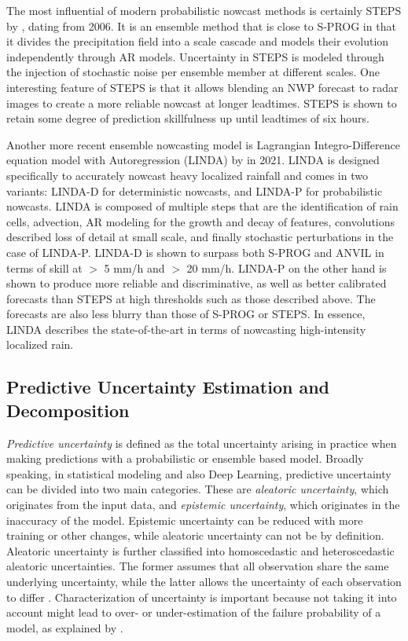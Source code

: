 The most influential of modern probabilistic nowcast methods is certainly STEPS by \citet{bowler_steps_2006}, dating from 2006. It is an ensemble method that is close to S-PROG in that it divides the precipitation field into a scale cascade and models their evolution independently through AR models. Uncertainty in STEPS is modeled through the injection of stochastic noise per ensemble member at different scales. One interesting feature of STEPS is that it allows blending an NWP forecast to radar images to create a more reliable nowcast at longer leadtimes. STEPS is shown to retain some degree of prediction skillfulness up until leadtimes of six hours. \citet{bowler_steps_2006}

Another more recent ensemble nowcasting model is Lagrangian Integro-Difference equation model with Autoregression (LINDA) by \citet{pulkkinen_lagrangian_2021} in 2021. LINDA is designed specifically to accurately nowcast heavy localized rainfall and comes in two variants: LINDA-D for deterministic nowcasts, and LINDA-P for probabilistic nowcasts. LINDA is composed of multiple steps that are the identification of rain cells, advection, AR modeling for the growth and decay of features, convolutions described loss of detail at small scale, and finally stochastic perturbations in the case of LINDA-P. LINDA-D is shown to surpass both S-PROG and ANVIL in terms of skill at  $>$ 5 mm/h and $>$ 20 mm/h. LINDA-P on the other hand is shown to produce more reliable and discriminative, as well as better calibrated forecasts than STEPS at high thresholds such as those described above. The forecasts are also less blurry than those of S-PROG or STEPS. In essence, LINDA describes the state-of-the-art in terms of nowcasting high-intensity localized rain. 


\subsection{Predictive Uncertainty Estimation and Decomposition}

\textit{Predictive uncertainty} is defined as the total uncertainty arising in practice when making predictions with a probabilistic or ensemble based model.
Broadly speaking, in statistical modeling and also Deep Learning, predictive uncertainty can be divided into two main categories. These are \textit{aleatoric uncertainty}, which originates from the input data, and \textit{epistemic uncertainty}, which originates in the inaccuracy of the model. Epistemic uncertainty can be reduced with more training or other changes, while aleatoric uncertainty can not be by definition. Aleatoric uncertainty is further classified into homoscedastic and heteroscedastic aleatoric uncertainties. The former assumes that all observation share the same underlying uncertainty, while the latter allows the uncertainty of each observation to differ \cite{shridhar_comprehensive_2019}. Characterization of uncertainty is important because not taking it into account might lead to over- or under-estimation of the failure probability of a model, as explained by \citet{kiureghian_aleatory_2009}. 


